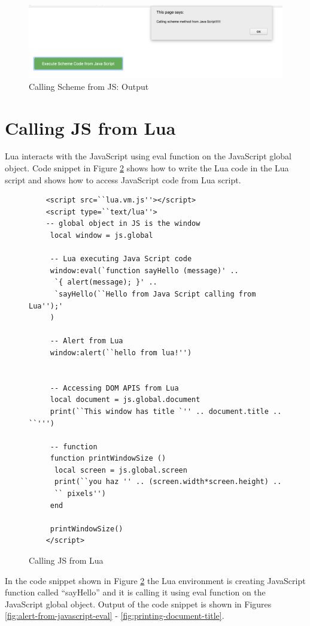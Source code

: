 \begin{figure}[H]
	\begin{center}
		\includegraphics[width=\linewidth]{./images/js-scheme-interaction.png}
	\end{center}
	\caption{Calling Scheme from JS: Output}
	\label{fig:js-scheme-interaction}
\end{figure}


\section{Calling JS from  Lua}

Lua interacts with the JavaScript using eval function on the JavaScript global object. Code snippet in  Figure \ref{fig:js-lua-interaction} shows how to write the Lua code in the Lua script and shows how to access JavaScript code from Lua script.


\begin{figure}[H]
	\begin{lstlisting}
	<script src=``lua.vm.js''></script>
	<script type=``text/lua''>
	-- global object in JS is the window
	 local window = js.global 
	
	 -- Lua executing Java Script code
	 window:eval(`function sayHello (message)' ..
	  `{ alert(message); }' ..
	  `sayHello(``Hello from Java Script calling from Lua'');'
	 ) 
	
	 -- Alert from Lua
	 window:alert(``hello from lua!'')
	
	
	 -- Accessing DOM APIS from Lua
	 local document = js.global.document
	 print(``This window has title `'' .. document.title .. ``''')
	
	 -- function
	 function printWindowSize ()
	  local screen = js.global.screen
	  print(``you haz '' .. (screen.width*screen.height) .. 
	  `` pixels'')
	 end
	
	 printWindowSize()
	</script>
	\end{lstlisting}
	\caption{Calling JS from Lua}
	\label{fig:js-lua-interaction}
\end{figure}


In the code snippet shown in Figure \ref{fig:js-lua-interaction} the Lua environment is creating JavaScript function called ``sayHello'' and it is calling it using eval function on the JavaScript global object. Output of the code snippet is shown in Figures \ref{fig:alert-from-javascript-eval} - \ref{fig:printing-document-title}.


